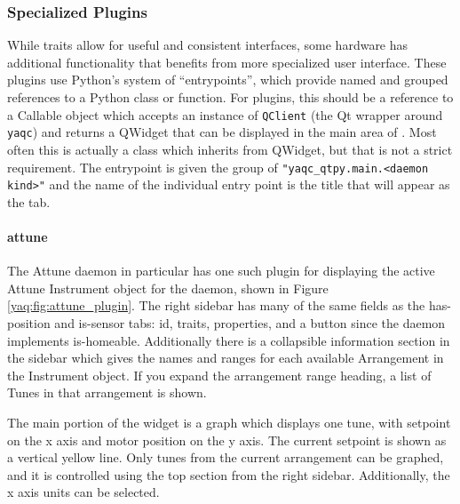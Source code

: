 \subsubsection{Specialized Plugins}

While traits allow for useful and consistent interfaces, some hardware has additional functionality that benefits from more specialized user interface.
These plugins use Python's system of ``entrypoints'', which provide named and grouped references to a Python class or function.
For \yaqcqtpy{} plugins, this should be a reference to a Callable object which accepts an instance of \texttt{QClient} (the Qt wrapper around \texttt{yaqc}) and returns a QWidget that can be displayed in the main area of \yaqcqtpy{}.
Most often this is actually a class which inherits from QWidget, but that is not a strict requirement.
The entrypoint is given the group of \texttt{"yaqc\_qtpy.main.<daemon kind>"} and the name of the individual entry point is the title that will appear as the tab.

\paragraph{attune}

The Attune daemon in particular has one such plugin for displaying the active Attune Instrument object for the daemon, shown in Figure \ref{yaq:fig:attune_plugin}.
The right sidebar has many of the same fields as the has-position and is-sensor tabs: id, traits, properties, and a button since the daemon implements is-homeable.
Additionally there is a collapsible information section in the sidebar which gives the names and ranges for each available Arrangement in the Instrument object.
If you expand the arrangement range heading, a list of Tunes in that arrangement is shown.

The main portion of the widget is a graph which displays one tune, with setpoint on the x axis and motor position on the y axis.
The current setpoint is shown as a vertical yellow line.
Only tunes from the current arrangement can be graphed, and it is controlled using the top section from the right sidebar.
Additionally, the x axis units can be selected.

